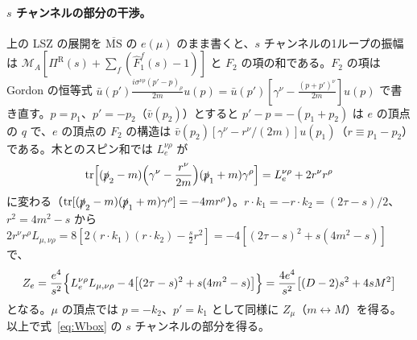 \documentclass[a4paper,10pt]{ltjsarticle}
\newcommand{\MSbar}{\overline{\mathrm{MS}}}
\begin{document}
\paragraph{$s$ チャンネルの部分の干渉。}上の LSZ の展開を $\MSbar$ の $e(\mu)$ のまま書くと、$s$ チャンネルの1ループの振幅は $\mathcal M_A[\Pi^{\mathrm R}(s)+\sum_f(\hat F_1^f(s)-1)]$ と $F_2$ の項の和である。$F_2$ の項は Gordon の恒等式 $\bar u(p')\frac{i\sigma^{\nu\rho}(p'-p)_\rho}{2m}u(p)=\bar u(p')[\gamma^\nu-\frac{(p+p')^\nu}{2m}]u(p)$ で書き直す。$p=p_1$、$p'=-p_2$（$\bar v(p_2)$）とすると $p'-p=-(p_1+p_2)$ は $e$ の頂点の $q$ で、$e$ の頂点の $F_2$ の構造は $\bar v(p_2)[\gamma^\nu-r^\nu/(2m)]u(p_1)$（$r\equiv p_1-p_2$）である。木とのスピン和では $L_e^{\nu\rho}$ が
\begin{equation*}
\mathrm{tr}\Bigl[(\slashed p_2-m)\Bigl(\gamma^\nu-\frac{r^\nu}{2m}\Bigr)(\slashed p_1+m)\gamma^\rho\Bigr]=L_e^{\nu\rho}+2r^\nu r^\rho
\end{equation*}
に変わる（$\mathrm{tr}[(\slashed p_2-m)(\slashed p_1+m)\gamma^\rho]=-4mr^\rho$）。$r\cdot k_1=-r\cdot k_2=(2\tau-s)/2$、$r^2=4m^2-s$ から $2r^\nu r^\rho L_{\mu,\nu\rho}=8[2(r\cdot k_1)(r\cdot k_2)-\frac s2r^2]=-4[(2\tau-s)^2+s(4m^2-s)]$ で、
\begin{equation*}
Z_e=\frac{e^4}{s^2}\Bigl\{L_e^{\nu\rho}L_{\mu,\nu\rho}-4\bigl[(2\tau-s)^2+s(4m^2-s)\bigr]\Bigr\}=\frac{4e^4}{s^2}\bigl[(D-2)s^2+4sM^2\bigr]
\end{equation*}
となる。$\mu$ の頂点では $p=-k_2$、$p'=k_1$ として同様に $Z_\mu$（$m\leftrightarrow M$）を得る。以上で式~\eqref{eq:Wbox} の $s$ チャンネルの部分を得る。
\end{document}
